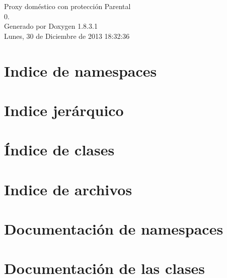 \documentclass{book}
\begin{document}
\hypersetup{pageanchor=false,citecolor=blue}
\begin{titlepage}
\vspace*{7cm}
\begin{center}
{\Large Proxy doméstico con protección Parental \\[1ex]\large 0. }\\
\vspace*{1cm}
{\large Generado por Doxygen 1.8.3.1}\\
\vspace*{0.5cm}
{\small Lunes, 30 de Diciembre de 2013 18:32:36}\\
\end{center}
\end{titlepage}
\clearemptydoublepage
{}
\tableofcontents
\clearemptydoublepage
{}
\hypersetup{pageanchor=true,citecolor=blue}
\chapter{Indice de namespaces}

\chapter{Indice jerárquico}

\chapter{Índice de clases}

\chapter{Indice de archivos}

\chapter{Documentación de namespaces}










\chapter{Documentación de las clases}





















\end{document}
